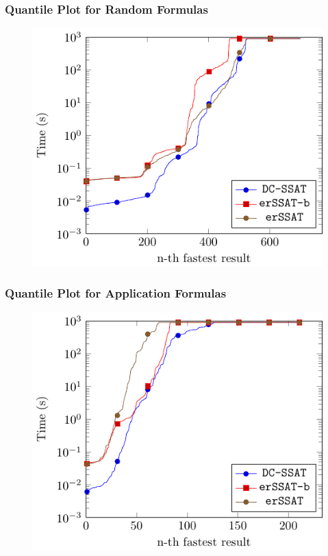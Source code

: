 \begin{frame}
    \frametitle{Quantile Plot for Random Formulas}
    \begin{figure}
        \centering
        \includegraphics{fig/exist-random-ssat/quantile-cputime-Random.pdf}
    \end{figure}
\end{frame}

\begin{frame}
    \frametitle{Quantile Plot for Application Formulas}
    \begin{figure}
        \centering
        \includegraphics{fig/exist-random-ssat/quantile-cputime-Application.pdf}
    \end{figure}
\end{frame}


